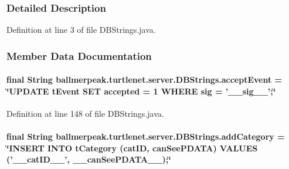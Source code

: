 \subsubsection{Detailed Description}


Definition at line 3 of file D\-B\-Strings.\-java.



\subsubsection{Member Data Documentation}
\hypertarget{classballmerpeak_1_1turtlenet_1_1server_1_1DBStrings_acf9b2fff82aaa6ad4d024ff69d1cba96}{
\paragraph[{accept\-Event}]{\setlength{\rightskip}{0pt plus 5cm}final String ballmerpeak.\-turtlenet.\-server.\-D\-B\-Strings.\-accept\-Event = \char`\"{}U\-P\-D\-A\-T\-E t\-Event S\-E\-T accepted = 1 W\-H\-E\-R\-E sig = '\-\_\-\-\_\-sig\-\_\-\-\_\-';\char`\"{}\hspace{0.3cm}{\ttfamily [static]}}}\label{classballmerpeak_1_1turtlenet_1_1server_1_1DBStrings_acf9b2fff82aaa6ad4d024ff69d1cba96}


Definition at line 148 of file D\-B\-Strings.\-java.

\hypertarget{classballmerpeak_1_1turtlenet_1_1server_1_1DBStrings_a4de95aa5509b7246d85f48577ea3822e}{
\paragraph[{add\-Category}]{\setlength{\rightskip}{0pt plus 5cm}final String ballmerpeak.\-turtlenet.\-server.\-D\-B\-Strings.\-add\-Category = \char`\"{}I\-N\-S\-E\-R\-T I\-N\-T\-O t\-Category (cat\-I\-D, {\bf can\-See\-P\-D\-A\-T\-A}) V\-A\-L\-U\-E\-S ('\-\_\-\-\_\-cat\-I\-D\-\_\-\-\_\-', \-\_\-\-\_\-can\-See\-P\-D\-A\-T\-A\-\_\-\-\_\-);\char`\"{}\hspace{0.3cm}{\ttfamily [static]}}}\label{classballmerpeak_1_1turtlenet_1_1server_1_1DBStrings_a4de95aa5509b7246d85f48577ea3822e}


